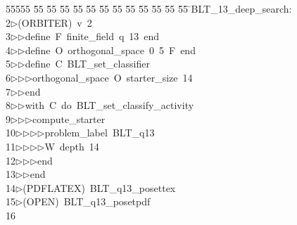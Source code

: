 %
%
\begin{tabbing}
55555 \= 55 \= 55 \= 55 \= 55 \= 55 \= 55 \= 55 \= 55 \= 55 \= 55 \= 55 \= 55 \= \>BLT\_13\_deep\_search:\\[0pt]
2\>$\triangleright$\>(ORBITER)\ v\ 2\ \\[0pt]
3\>$\triangleright$\>$\triangleright$\>define\ F\ finite\_field\ q\ 13\ end\ \\[0pt]
4\>$\triangleright$\>$\triangleright$\>define\ O\ orthogonal\_space\ 0\ 5\ F\ end\ \\[0pt]
5\>$\triangleright$\>$\triangleright$\>define\ C\ BLT\_set\_classifier\ \\[0pt]
6\>$\triangleright$\>$\triangleright$\>$\triangleright$\>orthogonal\_space\ O\ starter\_size\ 14\ \\[0pt]
7\>$\triangleright$\>$\triangleright$\>end\ \\[0pt]
8\>$\triangleright$\>$\triangleright$\>with\ C\ do\ BLT\_set\_classify\_activity\ \\[0pt]
9\>$\triangleright$\>$\triangleright$\>$\triangleright$\>compute\_starter\ \\[0pt]
10\>$\triangleright$\>$\triangleright$\>$\triangleright$\>$\triangleright$\>problem\_label\ BLT\_q13\ \\[0pt]
11\>$\triangleright$\>$\triangleright$\>$\triangleright$\>$\triangleright$\>W\ depth\ 14\ \\[0pt]
12\>$\triangleright$\>$\triangleright$\>$\triangleright$\>end\ \\[0pt]
13\>$\triangleright$\>$\triangleright$\>end\\[0pt]
14\>$\triangleright$\>(PDFLATEX)\ BLT\_q13\_posettex\\[0pt]
15\>$\triangleright$\>(OPEN)\ BLT\_q13\_posetpdf\\[0pt]
16\>\end{tabbing}
